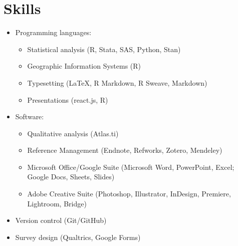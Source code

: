 \documentclass{cv_style}
\begin{document}

\section{Skills}
\begin{itemize}
    \item Programming languages: 
    \begin{itemize}
        \item Statistical analysis (R, Stata, SAS, Python, Stan)
        \item \parskip 1pt Geographic Information Systems (R)
        \item \parskip 1pt Typesetting (\LaTeX, R Markdown, R Sweave, Markdown) 
        \item \parskip 1pt Presentations (react.js, R) 
    \end{itemize}
    \item \parskip 1pt Software: 
    \begin{itemize}
        \item \parskip 1pt Qualitative analysis (Atlas.ti)
        \item \parskip 1pt Reference Management (Endnote, Refworks, Zotero, Mendeley)
        \item \parskip 1pt Microsoft Office/Google Suite (Microsoft Word, PowerPoint, Excel; Google Docs, Sheets, Slides)
        \item \parskip 1pt Adobe Creative Suite (Photoshop, Illustrator, InDesign, Premiere, Lightroom, Bridge)
    \end{itemize}
    \item \parskip 1pt Version control (Git/GitHub)
    \item \parskip 1pt Survey design (Qualtrics, Google Forms)
\end{itemize}
\end{document}
